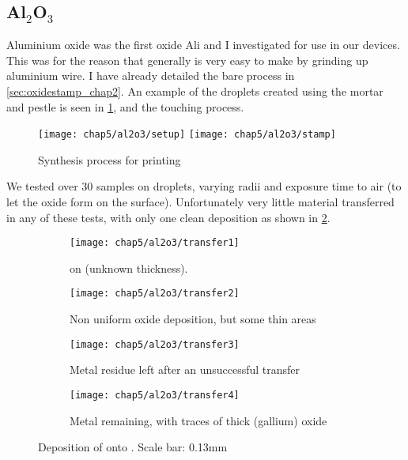 \documentclass[../Matt_Gebert_Honours_Thesis.tex]{subfiles}
\begin{document}
	\subsection{Al$_2$O$_3$}
		Aluminium oxide was the first oxide Ali and I investigated for use in our devices. This was for the reason that generally \aluminimumoxide{} is very easy to make by grinding up aluminium wire. I have already detailed the bare process in \cref{sec:oxidestamp_chap2}. An example of the droplets created using the mortar and pestle is seen in \cref{fig:al_synthesis}, and the touching process.		
		\begin{figure}[H]
			\centering
			\texttt{[image: chap5/al2o3/setup]}
			\texttt{[image: chap5/al2o3/stamp]}
			\caption[\aluminimumoxide{} synthesis process]{Synthesis process for printing \aluminimumoxide{} }\label{fig:al_synthesis}
		\end{figure}
		We tested over 30 samples on droplets, varying radii and exposure time to air (to let the oxide form on the surface). Unfortunately very little material transferred in any of these tests, with only one clean deposition as shown in \cref{fig:al2o3_1}. 
		\begin{figure}[H]
			\begin{subfigure}[t]{0.5\textwidth}
				\centering
				\texttt{[image: chap5/al2o3/transfer1]}
				\caption{\aluminimumoxide{} on \silicondioxide{} (unknown thickness).}\label{fig:al2o3_1}
			\end{subfigure}
			\begin{subfigure}[t]{0.5\textwidth}
				\centering
				\texttt{[image: chap5/al2o3/transfer2]}
				\caption{Non uniform oxide deposition, but some thin areas}\label{fig:al2o3_2}
			\end{subfigure}
			\begin{subfigure}[t]{0.5\textwidth}
				\centering
				\texttt{[image: chap5/al2o3/transfer3]}
				\caption{Metal residue left after an unsuccessful transfer}\label{fig:al2o3_3}
			\end{subfigure}
			\begin{subfigure}[t]{0.5\textwidth}
				\centering
				\texttt{[image: chap5/al2o3/transfer4]}
				\caption{Metal remaining, with traces of thick (gallium) oxide}\label{fig:al2o3_4}
			\end{subfigure}
		\caption[\aluminimumoxide{} printing on \silicondioxide{}]{Deposition of \aluminimumoxide{} onto \silicondioxide{}. Scale bar: 0.13mm}\label{fig:transfer_al_on_si}
		\end{figure}
\end{document}
